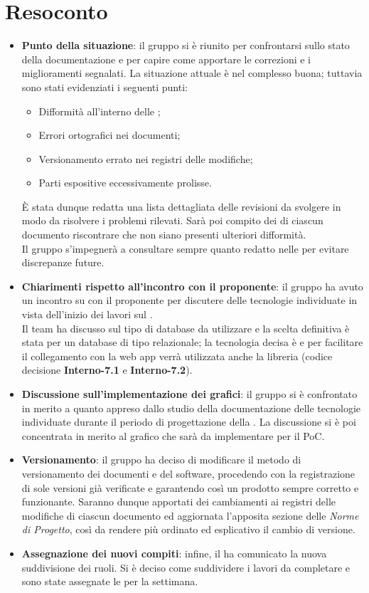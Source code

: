\section{Resoconto}
\begin{itemize}
\item \textbf{Punto della situazione}: il gruppo si è riunito per confrontarsi sullo stato della documentazione e per capire come apportare le correzioni e i miglioramenti segnalati. La situazione attuale è nel complesso buona; tuttavia sono stati evidenziati i seguenti punti:
	\begin{itemize}
		\item Difformità all'interno delle \NdPv{};
		\item Errori ortografici nei documenti;
		\item Versionamento errato nei registri delle modifiche;
		\item Parti espositive eccessivamente prolisse.
	\end{itemize} 
È stata dunque redatta una lista dettagliata delle revisioni da svolgere in modo da risolvere i problemi rilevati. Sarà poi compito dei  di ciascun documento riscontrare che non siano presenti ulteriori difformità. \\
Il gruppo s'impegnerà a consultare sempre quanto redatto nelle \NdPv{} per evitare discrepanze future.

\item\textbf{Chiarimenti rispetto all'incontro con il proponente}: il gruppo ha avuto un incontro su  con il proponente per discutere delle tecnologie individuate in vista dell'inizio dei lavori sul \textit{}. \\ Il team ha discusso sul tipo di database da utilizzare e la scelta definitiva è stata per un database di tipo relazionale; la tecnologia decisa è \textit{} e per facilitare il collegamento con la web app verrà utilizzata anche la libreria \textit{} (codice decisione \textbf{Interno-7.1} e \textbf{Interno-7.2}).

\item\textbf{Discussione sull'implementazione dei grafici}: il gruppo si è confrontato in merito a quanto appreso dallo studio della documentazione delle tecnologie individuate durante il periodo di progettazione della . La discussione si è poi concentrata in merito al grafico che sarà da implementare per il PoC.

\item\textbf{Versionamento}: il gruppo ha deciso di modificare il metodo di versionamento dei documenti e del software, procedendo con la registrazione di sole versioni già verificate e garantendo così un prodotto sempre corretto e funzionante. Saranno dunque apportati dei cambiamenti ai registri delle modifiche di ciascun documento ed aggiornata l'apposita sezione delle \textit{Norme di Progetto}, così da rendere più ordinato ed esplicativo il cambio di versione.

\item \textbf{Assegnazione dei nuovi compiti}: infine, il  ha comunicato la nuova suddivisione dei ruoli. Si è deciso come suddividere i lavori da completare e sono state assegnate le  per la settimana.
\end{itemize}

\newpage